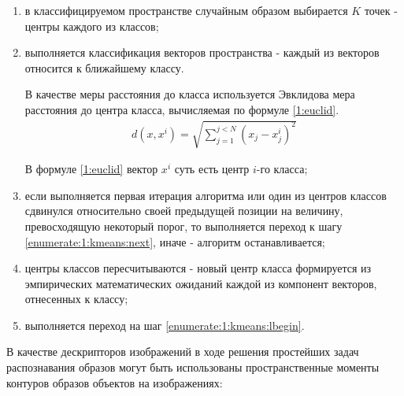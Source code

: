 \begin{enumerate}

	\item в классифицируемом пространстве случайным образом выбирается $K$ точек - центры каждого из классов;
	\item выполняется классификация векторов пространства - каждый из векторов относится к ближайшему классу. \label{enumerate:1:kmeans:lbegin}

	В качестве меры расстояния до класса используется Эвклидова мера расстояния до центра класса, вычисляемая по формуле \eqref{1:euclid}.
	\begin{gather}
		d(x, x^i) = \sqrt{\sum_{j = 1}^{j < N} (x_j - x_j^i)^2} \label{1:euclid}
	\end{gather}

	В формуле \eqref{1:euclid} вектор $x^i$ суть есть центр $i$-го класса;

	\item если выполняется первая итерация алгоритма или один из центров классов сдвинулся относительно своей предыдущей позиции на величину, превосходящую некоторый порог, то выполняется переход к шагу \ref{enumerate:1:kmeans:next}, иначе - алгоритм останавливается;
	\item центры классов пересчитываются - новый центр класса формируется из эмпирических математических ожиданий каждой из компонент векторов, отнесенных к классу; \label{enumerate:1:kmeans:next}
	\item выполняется переход на шаг \ref{enumerate:1:kmeans:lbegin}.

\end{enumerate}
	


В качестве дескрипторов изображений в ходе решения простейших задач распознавания образов могут быть использованы пространственные моменты контуров образов объектов на изображениях:

